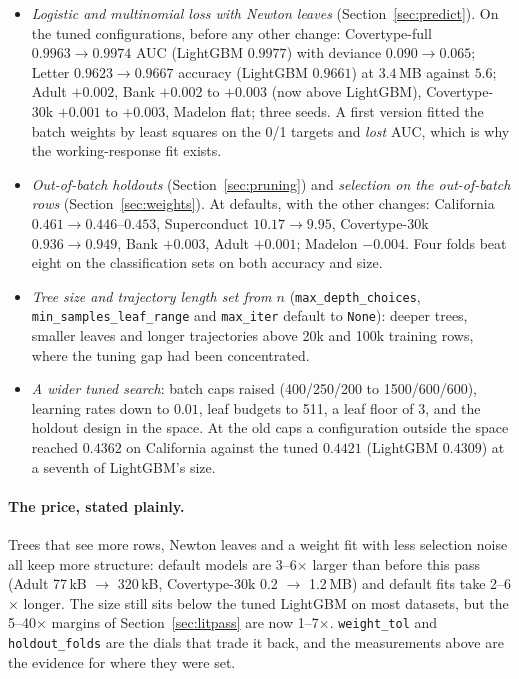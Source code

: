\documentclass[11pt,a4paper]{article}
\newcommand{\code}[1]{\texttt{\small #1}}
\theoremstyle{definition}
\begin{document}
\begin{itemize}[leftmargin=1.5em,itemsep=2pt]
\item \emph{Logistic and multinomial loss with Newton leaves}
(Section~\ref{sec:predict}). On the tuned configurations, before any other
change: Covertype-full $0.9963 \to 0.9974$ AUC (LightGBM $0.9977$) with
deviance $0.090 \to 0.065$; Letter $0.9623 \to 0.9667$ accuracy (LightGBM
$0.9661$) at $3.4$\,MB against $5.6$; Adult $+0.002$, Bank $+0.002$ to
$+0.003$ (now above LightGBM), Covertype-30k $+0.001$ to $+0.003$, Madelon
flat; three seeds. A first version fitted the batch weights by least squares
on the 0/1 targets and \emph{lost} AUC, which is why the working-response fit
exists.
\item \emph{Out-of-batch holdouts} (Section~\ref{sec:pruning}) and
\emph{selection on the out-of-batch rows} (Section~\ref{sec:weights}). At
defaults, with the other changes: California $0.461 \to 0.446$--$0.453$,
Superconduct $10.17 \to 9.95$, Covertype-30k $0.936 \to 0.949$, Bank
$+0.003$, Adult $+0.001$; Madelon $-0.004$. Four folds beat eight on the
classification sets on both accuracy and size.
\item \emph{Tree size and trajectory length set from $n$}
(\code{max\_depth\_choices}, \code{min\_samples\_leaf\_range} and
\code{max\_iter} default to \code{None}): deeper trees, smaller leaves and
longer trajectories above 20k and 100k training rows, where the tuning gap
had been concentrated.
\item \emph{A wider tuned search}: batch caps raised (400/250/200 to
1500/600/600), learning rates down to $0.01$, leaf budgets to 511, a leaf
floor of 3, and the holdout design in the space. At the old caps a
configuration outside the space reached $0.4362$ on California against the
tuned $0.4421$ (LightGBM $0.4309$) at a seventh of LightGBM's size.
\end{itemize}

\paragraph{The price, stated plainly.} Trees that see more rows, Newton
leaves and a weight fit with less selection noise all keep more structure:
default models are 3--6$\times$ larger than before this pass (Adult
77\,kB $\to$ 320\,kB, Covertype-30k 0.2 $\to$ 1.2\,MB) and default fits take
2--6$\times$ longer. The size still sits below the tuned LightGBM on most
datasets, but the 5--40$\times$ margins of Section~\ref{sec:litpass} are now
1--7$\times$. \code{weight\_tol} and \code{holdout\_folds} are the dials that
trade it back, and the measurements above are the evidence for where they
were set.
\end{document}
